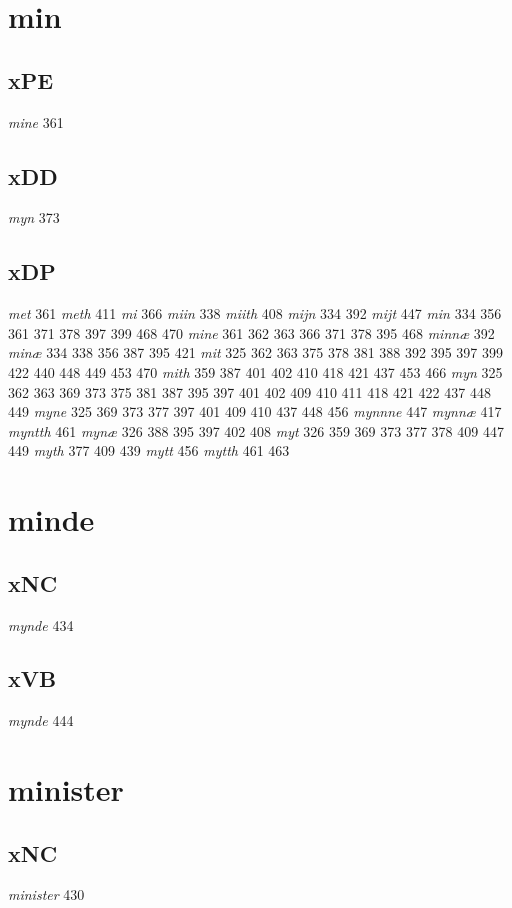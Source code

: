 \documentclass[a4paper,twocolumn]{article}
\begin{document}
\section{min}
\label{sec:org21a97bf}
\subsection{xPE}
\label{sec:org6f46c12}
\emph{mine} 361 
\subsection{xDD}
\label{sec:org40fc3ff}
\emph{myn} 373 
\subsection{xDP}
\label{sec:orga62ab68}
\emph{met} 361 \emph{meth} 411 \emph{mi} 366 \emph{miin} 338 \emph{miith} 408 \emph{mijn} 334 392 \emph{mijt} 447 \emph{min} 334 356 361 371 378 397 399 468 470 \emph{mine} 361 362 363 366 371 378 395 468 \emph{minnæ} 392 \emph{minæ} 334 338 356 387 395 421 \emph{mit} 325 362 363 375 378 381 388 392 395 397 399 422 440 448 449 453 470 \emph{mith} 359 387 401 402 410 418 421 437 453 466 \emph{myn} 325 362 363 369 373 375 381 387 395 397 401 402 409 410 411 418 421 422 437 448 449 \emph{myne} 325 369 373 377 397 401 409 410 437 448 456 \emph{mynnne} 447 \emph{mynnæ} 417 \emph{myntth} 461 \emph{mynæ} 326 388 395 397 402 408 \emph{myt} 326 359 369 373 377 378 409 447 449 \emph{myth} 377 409 439 \emph{mytt} 456 \emph{mytth} 461 463 
\section{minde}
\label{sec:orgcfad244}
\subsection{xNC}
\label{sec:org2634dd0}
\emph{mynde} 434 
\subsection{xVB}
\label{sec:org140715c}
\emph{mynde} 444 
\section{minister}
\label{sec:org6155bf6}
\subsection{xNC}
\label{sec:org91c95db}
\emph{minister} 430 
\end{document}

